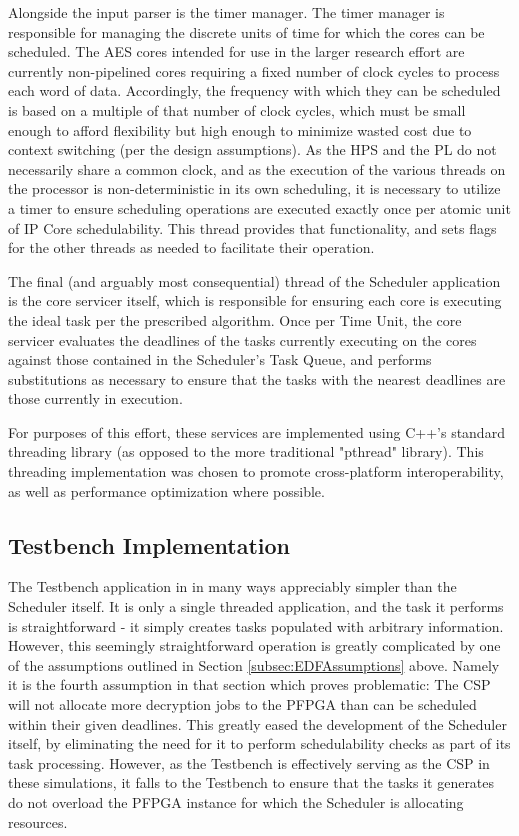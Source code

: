 Alongside the input parser is the timer manager. The timer manager is responsible for managing the discrete units of time for which the cores can be scheduled. The AES cores intended for use in the larger research effort are currently non-pipelined cores requiring a fixed number of clock cycles to process each word of data. Accordingly, the frequency with which they can be scheduled is based on a multiple of that number of clock cycles, which must be small enough to afford flexibility but high enough to minimize wasted cost due to context switching (per the design assumptions). As the HPS and the PL do not necessarily share a common clock, and as the execution of the various threads on the processor is non-deterministic in its own scheduling, it is necessary to utilize a timer to ensure scheduling operations are executed exactly once per atomic unit of IP Core schedulability. This thread provides that functionality, and sets flags for the other threads as needed to facilitate their operation.

The final (and arguably most consequential) thread of the Scheduler application is the core servicer itself, which is responsible for ensuring each core is executing the ideal task per the prescribed algorithm. Once per Time Unit, the core servicer evaluates the deadlines of the tasks currently executing on the cores against those contained in the Scheduler's Task Queue, and performs substitutions as necessary to ensure that the tasks with the nearest deadlines are those currently in execution. 

For purposes of this effort, these services are implemented using C++'s standard threading library (as opposed to the more traditional "pthread" library). This threading implementation was chosen to promote cross-platform interoperability, as well as performance optimization where possible.


\subsection{Testbench Implementation}\label{subsec:TestbenchImpl}
The Testbench application in in many ways appreciably simpler than the Scheduler itself. It is only a single threaded application, and the task it performs is straightforward - it simply creates tasks populated with arbitrary information. However, this seemingly straightforward operation is greatly complicated by one of the assumptions outlined in Section \ref{subsec:EDFAssumptions} above. Namely it is the fourth assumption in that section which proves problematic: The CSP will not allocate more decryption jobs to the PFPGA than can be scheduled within their given deadlines. This greatly eased the development of the Scheduler itself, by eliminating the need for it to perform schedulability checks as part of its task processing. However, as the Testbench is effectively serving as the CSP in these simulations, it falls to the Testbench to ensure that the tasks it generates do not overload the PFPGA instance for which the Scheduler is allocating resources.

